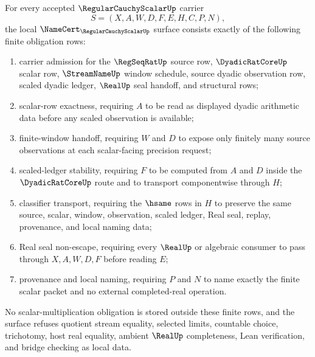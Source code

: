 \begin{theorem}
\label{thm:regular-cauchy-scalar-namecert-obligations}
For every accepted $\RegularCauchyScalarUp$ carrier
$$
S=(X,A,W,D,F,E,H,C,P,N),
$$
the local $\NameCert_{\RegularCauchyScalarUp}$ surface consists exactly of the following finite obligation rows:
\begin{enumerate}
\item carrier admission for the $\RegSeqRatUp$ source row, $\DyadicRatCoreUp$ scalar row, $\StreamNameUp$ window schedule, source dyadic observation row, scaled dyadic ledger, $\RealUp$ seal handoff, and structural rows;
\item scalar-row exactness, requiring $A$ to be read as displayed dyadic arithmetic data before any scaled observation is available;
\item finite-window handoff, requiring $W$ and $D$ to expose only finitely many source observations at each scalar-facing precision request;
\item scaled-ledger stability, requiring $F$ to be computed from $A$ and $D$ inside the $\DyadicRatCoreUp$ route and to transport componentwise through $H$;
\item classifier transport, requiring the $\hsame$ rows in $H$ to preserve the same source, scalar, window, observation, scaled ledger, Real seal, replay, provenance, and local naming data;
\item Real seal non-escape, requiring every $\RealUp$ or algebraic consumer to pass through $X,A,W,D,F$ before reading $E$;
\item provenance and local naming, requiring $P$ and $N$ to name exactly the finite scalar packet and no external completed-real operation.
\end{enumerate}
No scalar-multiplication obligation is stored outside these finite rows, and the surface refuses quotient stream equality, selected limits, countable choice, trichotomy, host real equality, ambient $\RealUp$ completeness, Lean verification, and bridge checking as local data.
\end{theorem}
